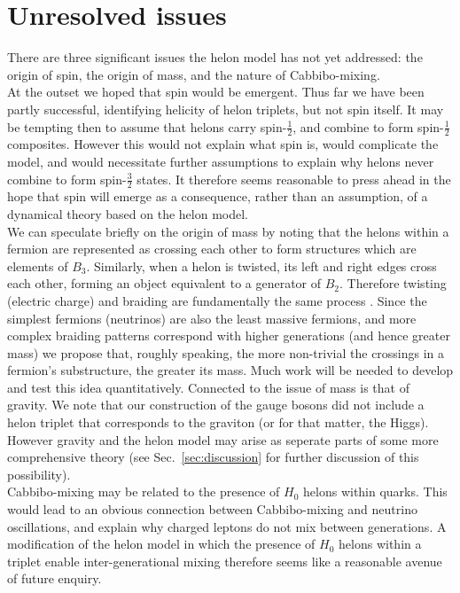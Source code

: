 \documentclass[twocolumn,showpacs,preprintnumbers,amsmath,amssymb]{revtex4}
\begin{document}
\section{Unresolved issues}
\label{sec:issues}
There are three significant issues the helon model has not yet 
addressed: the origin of spin, the origin of mass, and the nature 
of Cabbibo-mixing.\\ 
At the outset we hoped that spin would be emergent. Thus far we have been partly 
successful, identifying helicity of helon triplets, but not spin itself. It may 
be tempting then to assume that helons carry spin-$\frac{1}{2}$, and combine to 
form spin-$\frac{1}{2}$ composites. However this would not explain what spin is, 
would complicate the model, and would necessitate further assumptions to explain 
why helons never combine to form spin-$\frac{3}{2}$ states. It therefore seems 
reasonable to press ahead in the hope that spin will emerge as a consequence, 
rather than an assumption, of a dynamical 
theory based on the helon model.\\
We can speculate briefly on the origin of mass by noting that the helons within a 
fermion are represented as crossing each other to form structures which are elements 
of $B_3$. Similarly, when a helon is twisted, its left and right edges cross each 
other, forming an object equivalent to a generator of $B_2$. Therefore twisting 
(electric charge) and braiding are fundamentally the same process%
. Since the simplest fermions (neutrinos) are also the least 
massive fermions, and more complex braiding patterns correspond with higher 
generations (and hence greater mass) we propose that, roughly speaking, the more 
non-trivial the crossings in a fermion's substructure, the greater its mass. Much 
work will be needed to develop and test this idea quantitatively. Connected to the 
issue of mass is that of gravity. We note that our construction of the gauge bosons 
did not include a helon triplet that corresponds to the graviton (or for that 
matter, the Higgs). However gravity and the helon model may arise as seperate parts of some
more comprehensive theory (see Sec.~\ref{sec:discussion} for further discussion of this 
possibility).\\
Cabbibo-mixing may be related to the presence of $H_0$ helons within quarks. 
This would lead to an obvious connection between Cabbibo-mixing and neutrino 
oscillations, and explain why charged leptons do not mix between generations.
A modification of the helon model in which the presence of $H_0$ helons within 
a triplet enable inter-generational mixing therefore seems like a reasonable 
avenue of future enquiry.
\end{document}
